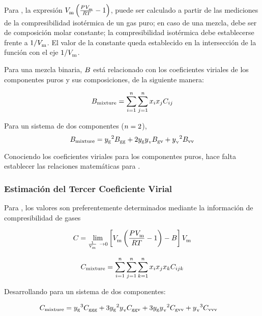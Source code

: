 Para \parencite[p. 473]{beattie1942second}, la expresión $\Vmolar \left(\frac{\pressure{}{} \Vmolar} {\univConstGasEos \T{}} - 1 \right)$, puede ser calculado a partir de las mediciones de la compresibilidad isotérmica de un gas puro; en caso de una mezcla, debe ser de composición molar constante; la compresibilidad isotérmica debe establecerse frente a $1 / \Vmolar$. El valor de la constante queda establecido en la intersección de la función con el eje $1/ \Vmolar$.

Para una mezcla binaria, $\bCoeffVirial{}$ está relacionado con los coeficientes viriales de los componentes puros y sus composiciones, de la siguiente manera:

\begin{equation}
  \eqSecondVirialCoeffSum{}
\end{equation}

Para un sistema de dos componentes ($\symNumOfCmpnts = 2$),
\begin{equation}
  \eqSecondVirialCoeffDevelop{}
\end{equation}
\eqSecondVirialCoeffNaming{}

Conociendo los coeficientes viriales para los componentes puros, hace falta establecer las relaciones matemáticas para {\bCoeffVirial{\nameG \nameV}}.



\subsubsection{Estimación del Tercer Coeficiente Virial}
Para \parencite{Dymond2002}, los valores son preferentemente determinados mediante la información de compresibilidad de gases 

\begin{equation}
  \cCoeffVirial{} = \lim_{\frac{1}{\Vmolar}\ \to {0}} \left[ \Vmolar \left(\frac{\pressure{}{} \Vmolar} {\univConstGasEos \T{}} - 1 \right) - \bCoeffVirial{} \right] \Vmolar
\end{equation}


\begin{equation}
  \eqThirdVirialCoeffSum{}
\end{equation}

Desarrollando para un sistema de dos componentes:

\begin{equation}
  \thirdVirialCoeffDevelop{}
\end{equation}

\eqThirdVirialCoeffNaming{}

